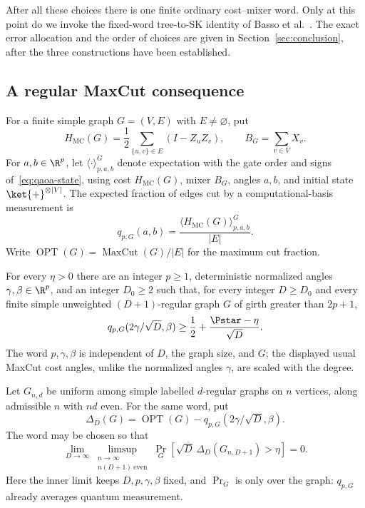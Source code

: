 After all these choices there is one finite ordinary cost--mixer
word. Only at this point do we invoke the fixed-word tree-to-SK
identity of Basso et al.~\cite{BFMVZ2022}. The exact error allocation
and the order of choices are given in Section~\ref{sec:conclusion},
after the three constructions have been established.

\subsection{A regular MaxCut consequence}\label{sec:regular-maxcut}

For a finite simple graph $G=(V,E)$ with $E\ne\varnothing$, put
\[
 H_{\mathrm{MC}}(G)=\frac12\sum_{\{u,v\}\in E}(I-Z_uZ_v),
 \qquad B_G=\sum_{v\in V}X_v.
\]
For $a,b\in\R^p$, let $\langle\cdot\rangle^G_{p,a,b}$ denote expectation
with the gate order and signs of~\eqref{eq:qaoa-state}, using cost
$H_{\mathrm{MC}}(G)$, mixer $B_G$, angles $a,b$, and initial state
$\ket{+}^{\otimes |V|}$.  The expected fraction of edges cut by a
computational-basis measurement is
\[
 q_{p,G}(a,b)=\frac{\langle H_{\mathrm{MC}}(G)\rangle^G_{p,a,b}}{|E|}.
\]
Write $\operatorname{OPT}(G)=\operatorname{MaxCut}(G)/|E|$ for the maximum
cut fraction.

\begin{corollary}
\label{cor:regular-maxcut}
For every $\eta>0$ there are an integer $p\ge1$, deterministic normalized
angles $\gamma,\beta\in\R^p$, and an integer $D_0\ge2$ such that, for every
integer $D\ge D_0$ and every finite simple unweighted $(D+1)$-regular graph
$G$ of girth greater than $2p+1$,
\begin{equation}\label{eq:high-girth-maxcut}
 q_{p,G}(2\gamma/\sqrt D,\beta)
 \ge \frac12+\frac{\Pstar-\eta}{\sqrt D}.
\end{equation}
The word $p,\gamma,\beta$ is independent of $D$, the graph size, and $G$;
the displayed usual MaxCut cost angles, unlike the normalized angles
$\gamma$, are scaled with the degree.

Let $G_{n,d}$ be uniform among simple labelled $d$-regular graphs on $n$
vertices, along admissible $n$ with $nd$ even.  For the same word, put
\[
 \Delta_D(G)=\operatorname{OPT}(G)
             -q_{p,G}(2\gamma/\sqrt D,\beta).
\]
The word may be chosen so that
\begin{equation}\label{eq:random-regular-maxcut}
 \lim_{D\to\infty}
 \limsup_{\substack{n\to\infty\\ n(D+1)\ \mathrm{even}}}
 \Pr_G\!\left[\sqrt D\,\Delta_D(G_{n,D+1})>\eta\right]=0.
\end{equation}
Here the inner limit keeps $D,p,\gamma,\beta$ fixed, and $\Pr_G$ is only
over the graph: $q_{p,G}$ already averages quantum measurement.
\end{corollary}

